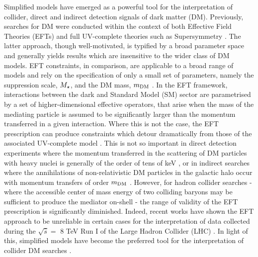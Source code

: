 
Simplified models have emerged as a powerful tool for the interpretation of collider, direct and indirect detection signals of dark matter (DM). Previously,  searches for DM were conducted within the context of both Effective Field Theories (EFTs) \cite{Aad:1363019, ATLAS-CONF-2012-147, CMS-PAS-EXO-12-048, Buckley:2013jwa, Abdallah:1472683, MonoZ, MonoX} and full UV-complete theories such as Supersymmetry \cite{ComppMSSM, Aad:2012ms, Aad:2012fqa, Aad:2014wea, SUSY_official_paper}. The latter approach, though well-motivated, is typified by a broad parameter space and generally yields results which are insensitive to the wider class of DM models. EFT constraints, in comparison, are applicable to a broad range of models and rely on the specification of only a small set of parameters, namely the suppression scale, $M_{\star}$, and the DM mass, $m_{\mathrm{DM}}$ \cite{}.
In the EFT framework, interactions between the dark and Standard Model (SM) sector are parametrised by a set of higher-dimensional effective operators, that arise when the mass of the mediating particle is assumed to be significantly larger than the momentum transferred in a given interaction. Where this is not the case, the EFT prescription can produce constraints which detour dramatically from those of the associated UV-complete model \cite{Bai:2010hh, DMCons2, Fox:2011fx, Graesser:2011vj, An:2011ck}. This is not so important in direct detection experiments where the momentum transferred in the scattering of DM particles with heavy nuclei is generally of the order of tens of keV \cite{EFTDM, DMCons3}, or in indirect searches where the annihilations of non-relativistic DM particles in the galactic halo occur with momentum transfers of order $m_{\mathrm{DM}}$ \cite{}. However, for hadron collider searches - where the accessible center of mass energy of two colliding baryons may be sufficient to produce the mediator on-shell - the range of validity of the EFT prescription is significantly diminished. Indeed, recent works have shown the EFT approach to be unreliable in certain cases for the interpretation of data collected during the $\sqrt{\hat{s}} =$ 8 TeV Run I of the Large Hadron Collider (LHC) \cite{}. In light of this, simplified models have become the preferred tool for the interpretation of collider DM searches \cite{Harris:2014hga, Buchmueller:2014yoa}.


